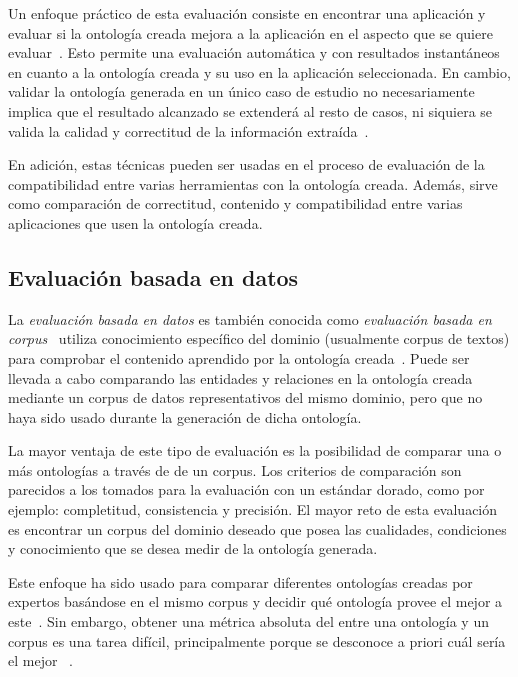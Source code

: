 Un enfoque práctico de esta evaluación consiste en encontrar una aplicación y evaluar si la ontología creada mejora a la aplicación en el aspecto que se quiere evaluar~\cite{ref:95}. Esto permite una evaluación automática y con resultados instantáneos en cuanto a la ontología creada y su uso en la aplicación seleccionada. En cambio, validar la ontología generada en un único caso de estudio no necesariamente implica que el resultado alcanzado se extenderá al resto de casos, ni siquiera se valida la calidad y correctitud de la información extraída~\cite{ref:34}.

En adición, estas técnicas pueden ser usadas en el proceso de evaluación de la compatibilidad entre varias herramientas con la ontología creada. Además, sirve como comparación de correctitud, contenido y compatibilidad entre varias aplicaciones que usen la ontología creada.

\subsection{Evaluación basada en datos}
La \textit{evaluación basada en datos} es también conocida como \textit{evaluación basada en corpus}~\cite{ref:96} utiliza conocimiento específico del dominio (usualmente corpus de textos)  para comprobar el contenido aprendido por la ontología creada~\cite{ref:28}. Puede ser llevada a cabo comparando las entidades y relaciones en la ontología creada mediante un corpus de datos representativos del mismo dominio, pero que no haya sido usado durante la generación de dicha ontología.

La mayor ventaja de este tipo de evaluación es la posibilidad de comparar una o más ontologías a través de de un corpus. Los criterios de comparación son parecidos a los tomados para la evaluación con un estándar dorado, como por ejemplo: completitud, consistencia y precisión. El mayor reto de esta evaluación es encontrar un corpus del dominio deseado que posea las cualidades, condiciones y conocimiento que se desea medir de la ontología generada.

Este enfoque ha sido usado para comparar diferentes ontologías creadas por expertos basándose en el mismo corpus y decidir qué ontología provee el mejor  a este~\cite{ref:29}. Sin embargo, obtener una métrica absoluta del  entre una ontología y un corpus es una tarea difícil, principalmente porque se desconoce a priori cuál sería el mejor ~\cite{ref:34}.

